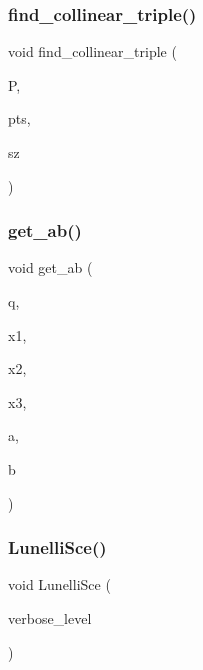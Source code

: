 \subsubsection{\texorpdfstring{find\+\_\+collinear\+\_\+triple()}{find\_collinear\_triple()}}
{\footnotesize\ttfamily void find\+\_\+collinear\+\_\+triple (\begin{DoxyParamCaption}\item[{\mbox{\hyperlink{classprojective__space}{projective\+\_\+space}} $\ast$}]{P,  }\item[{\mbox{\hyperlink{galois_8h_a09fddde158a3a20bd2dcadb609de11dc}{I\+NT}} $\ast$}]{pts,  }\item[{\mbox{\hyperlink{galois_8h_a09fddde158a3a20bd2dcadb609de11dc}{I\+NT}}}]{sz }\end{DoxyParamCaption})}

\mbox{\label{conic_8_c_a8b8cda8184aaa03f9acf5301239cda22}} 
\subsubsection{\texorpdfstring{get\+\_\+ab()}{get\_ab()}}
{\footnotesize\ttfamily void get\+\_\+ab (\begin{DoxyParamCaption}\item[{\mbox{\hyperlink{galois_8h_a09fddde158a3a20bd2dcadb609de11dc}{I\+NT}}}]{q,  }\item[{\mbox{\hyperlink{galois_8h_a09fddde158a3a20bd2dcadb609de11dc}{I\+NT}}}]{x1,  }\item[{\mbox{\hyperlink{galois_8h_a09fddde158a3a20bd2dcadb609de11dc}{I\+NT}}}]{x2,  }\item[{\mbox{\hyperlink{galois_8h_a09fddde158a3a20bd2dcadb609de11dc}{I\+NT}}}]{x3,  }\item[{\mbox{\hyperlink{galois_8h_a09fddde158a3a20bd2dcadb609de11dc}{I\+NT}} \&}]{a,  }\item[{\mbox{\hyperlink{galois_8h_a09fddde158a3a20bd2dcadb609de11dc}{I\+NT}} \&}]{b }\end{DoxyParamCaption})}

\mbox{\label{conic_8_c_aff3f16a42ec8b9efa78fc209b8ab5452}} 
\subsubsection{\texorpdfstring{Lunelli\+Sce()}{LunelliSce()}}
{\footnotesize\ttfamily void Lunelli\+Sce (\begin{DoxyParamCaption}\item[{\mbox{\hyperlink{galois_8h_a09fddde158a3a20bd2dcadb609de11dc}{I\+NT}}}]{verbose\+\_\+level }\end{DoxyParamCaption})}

